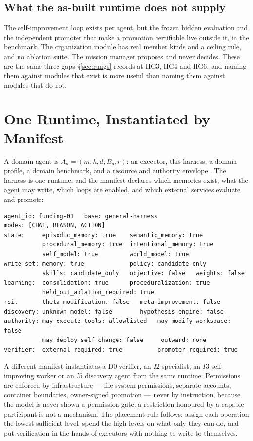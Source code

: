 \subsection{What the as-built runtime does not supply}

The self-improvement loop exists per agent, but the frozen hidden evaluation and the independent promoter that make a promotion certifiable live outside it, in the benchmark. The organization module has real member kinds and a ceiling rule, and no ablation suite. The mission manager proposes and never decides. These are the same three gaps \S\ref{sec:rungs} records at HG3, HG4 and HG6, and naming them against modules that exist is more useful than naming them against modules that do not.

\section{One Runtime, Instantiated by Manifest}\label{sec:manifest}

A domain agent is $A_d = (m, h, d, B_d, r)$: an executor, this harness, a domain profile, a domain benchmark, and a resource and authority envelope \citep{yang2026plan}. The harness is one runtime, and the manifest declares which memories exist, what the agent may write, which loops are enabled, and which external services evaluate and promote:

{\small\begin{verbatim}
agent_id: funding-01   base: general-harness
modes: [CHAT, REASON, ACTION]
state:     episodic_memory: true    semantic_memory: true
           procedural_memory: true  intentional_memory: true
           self_model: true         world_model: true
write_set: memory: true             policy: candidate_only
           skills: candidate_only   objective: false   weights: false
learning:  consolidation: true      proceduralization: true
           held_out_ablation_required: true
rsi:       theta_modification: false   meta_improvement: false
discovery: unknown_model: false        hypothesis_engine: false
authority: may_execute_tools: allowlisted   may_modify_workspace: false
           may_deploy_self_change: false     outward: none
verifier:  external_required: true          promoter_required: true
\end{verbatim}}

A different manifest instantiates a D0 verifier, an $I2$ specialist, an $I3$ self-improving worker or an $I5$ discovery agent from the same runtime. Permissions are enforced by infrastructure --- file-system permissions, separate accounts, container boundaries, owner-signed promotion --- never by instruction, because the model is never shown a permission gate: a restriction honoured by a capable participant is not a mechanism. The placement rule follows: assign each operation the lowest sufficient level, spend the high levels on what only they can do, and put verification in the hands of executors with nothing to write to themselves.

